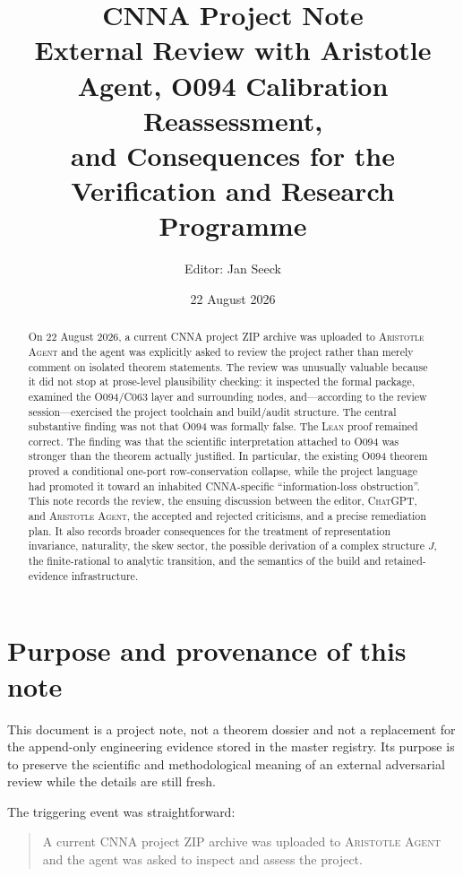 \documentclass[11pt,a4paper]{article}
\title{\textbf{CNNA Project Note}\\[0.5em]
External Review with Aristotle Agent, O094 Calibration Reassessment,\\
and Consequences for the Verification and Research Programme}
\author{Editor: Jan Seeck}
\date{22 August 2026}
\newcommand{\CNNA}{\textsc{CNNA}}
\newcommand{\Lean}{\textsc{Lean}}
\newcommand{\Aristotle}{\textsc{Aristotle Agent}}
\newcommand{\ChatGPT}{\textsc{ChatGPT}}
\begin{document}
\maketitle

\begin{abstract}
On 22 August 2026, a current \CNNA{} project ZIP archive was uploaded to \Aristotle{} and the agent was explicitly asked to review the project rather than merely comment on isolated theorem statements. The review was unusually valuable because it did not stop at prose-level plausibility checking: it inspected the formal package, examined the O094/C063 layer and surrounding nodes, and---according to the review session---exercised the project toolchain and build/audit structure. The central substantive finding was not that O094 was formally false. The \Lean{} proof remained correct. The finding was that the scientific interpretation attached to O094 was stronger than the theorem actually justified. In particular, the existing O094 theorem proved a conditional one-port row-conservation collapse, while the project language had promoted it toward an inhabited CNNA-specific ``information-loss obstruction''. This note records the review, the ensuing discussion between the editor, \ChatGPT{}, and \Aristotle{}, the accepted and rejected criticisms, and a precise remediation plan. It also records broader consequences for the treatment of representation invariance, naturality, the skew sector, the possible derivation of a complex structure $J$, the finite-rational to analytic transition, and the semantics of the build and retained-evidence infrastructure.
\end{abstract}

\tableofcontents
\newpage

\section{Purpose and provenance of this note}

This document is a project note, not a theorem dossier and not a replacement for the append-only engineering evidence stored in the master registry. Its purpose is to preserve the scientific and methodological meaning of an external adversarial review while the details are still fresh.

The triggering event was straightforward:

\begin{quote}
A current \CNNA{} project ZIP archive was uploaded to \Aristotle{} and the agent was asked to inspect and assess the project.
\end{quote}
\end{document}
